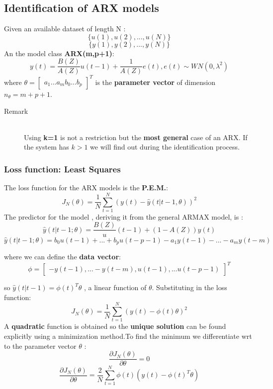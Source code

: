 \subsection{Identification of ARX models}
Given an available dataset of length N :
$$ \{ u(1),u(2),...,u(N)\}$$
$$ \{ y(1),y(2),...,y(N)\}$$
An the model class \textbf{ARX(m,p+1)}:
$$ y(t) = \frac{B(Z)}{A(Z)}u(t-1)+\frac{1}{A(Z)}e(t) , e(t) \sim WN(0,\lambda^2)$$
where
 $ \theta = \begin{bmatrix}
                a_1  
                ...  
                a_m 
                b_0  
                ...  
                b_p 
             \end{bmatrix}^T$ 
is the \textbf{parameter vector} of dimension $n_{\theta} = m+p+1$.
\begin{description}
\item[Remark]\hfill\\
Using \textbf{k=1} is not a restriction but the \textbf{most general} case of an ARX. If the system has $k > 1$ we will find out during the identification process.
\end{description}
\subsubsection{Loss function: Least Squares}
The loss function for the ARX models is the \textbf{P.E.M.}:
\[
\boxed{J_N(\theta) = \frac{1}{N} \sum\limits_{t=1}^{N}(y(t)-\hat{y}(t|t-1,\theta))^2}
\]
The predictor for the model , deriving it from the  general ARMAX model, is :
$$ \hat{y}(t|t-1;\theta) = \frac{B(Z)}u(t-1)+ (1-A(Z))y(t)$$
\[
\boxed{\hat{y}(t|t-1;\theta) = b_0u(t-1)+...+b_pu(t-p-1)-a_1y(t-1)-...-a_my(t-m)}
\]

where we can define the \textbf{data vector}:
$$ \phi = \begin{bmatrix}
                -y(t-1),  
                ...  
                -y(t-m) ,
                
                u(t-1),
                ...  
                u(t-p-1) 
             \end{bmatrix}^T$$ 

so $\hat{y}(t|t-1) = \phi(t)^T \theta$ , a linear function of $\theta$. Substituting in the loss function:
$$ J_N(\theta)= \frac{1}{N} \sum\limits_{t=1}^{N}(y(t) - \phi(t)\theta)^2$$
A \textbf{quadratic} function is obtained so the \textbf{unique solution} can be found explicitly using a minimization method.To find the minimum we differentiate wrt to the parameter vector $\theta$ : 
$$ \frac{\partial{J_N(\theta)}}{\partial \theta} = 0$$
$$ \frac{\partial{J_N(\theta)}}{\partial \theta} = \frac{2}{N}\sum\limits_{t=1}^{N}\phi(t)(y(t)-\phi(t)^T\theta)$$

